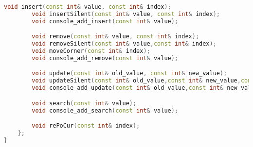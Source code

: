 \begin{lstlisting}[language=C++]
		void insert(const int& value, const int& index);
		void insertSilent(const int& value, const int& index);
		void console_add_insert(const int& value);

		void remove(const int& value, const int& index);
		void removeSilent(const int& value,const int& index);
		void moveCorner(const int& index);
		void console_add_remove(const int& value);

		void update(const int& old_value, const int& new_value);
		void updateSilent(const int& old_value,const int& new_value,const int& index);
		void console_add_update(const int& old_value,const int& new_value);

		void search(const int& value);
		void console_add_search(const int& value);

		void rePoCur(const int& index);
	};
}





\end{lstlisting}
